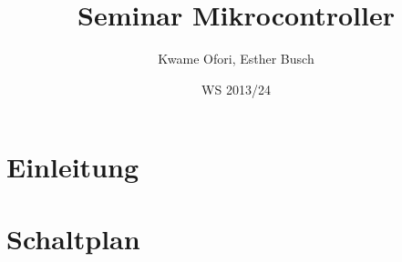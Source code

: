 \documentclass[11pt,twoside,a4paper]{article}
\begin{document}
\title{Seminar Mikrocontroller}
\author{Kwame Ofori, Esther Busch}
\date{WS 2013/24}
\maketitle

\newpage
\section{Einleitung}

\section{Schaltplan}
\end{document}
